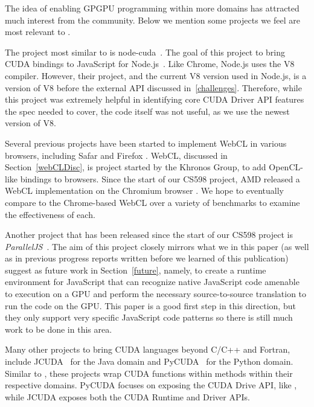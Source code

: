 
The idea of enabling GPGPU programming within more domains has attracted much
interest from the community. Below we mention some projects we feel are most relevant
to \namens.

The project most similar to \name is node-cuda~\cite{nodeCuda}. The goal of this
project to bring CUDA bindings to JavaScript for Node.js~\cite{nodeJS}. Like
Chrome, Node.js uses the V8 compiler. However, their project, and the current V8
version used in Node.js, is a version of V8 before the external API discussed
in~\ref{challenges}. Therefore, while this project was extremely helpful in
identifying core CUDA Driver API features the \name spec needed to cover, the
code itself was not useful, as we use the newest version of V8.

Several previous projects have been started to implement WebCL \cite{webCL} in various
browsers, including Safar \cite{safarWebCL} and Firefox \cite{firefoxWebCL}.
WebCL, discussed in Section~\ref{webCLDisc}, is project started by the Khronos
Group, to add OpenCL-like bindings to browsers. Since the start of our CS598
project, AMD released a WebCL implementation on the Chromium browser
\cite{chromeWebCL}. We hope to eventually compare \name to the Chrome-based
WebCL over a variety of benchmarks to examine the effectiveness of each.

Another project that has been released since the start of our CS598 project is
\textit{ParallelJS}~\cite{parallelJS}. The aim of this project closely mirrors
what we in this paper (as well as in previous progress reports written before we
learned of this publication) suggest as future work in Section~\ref{future}, namely, to create a
runtime environment for JavaScript that can recognize native JavaScript code amenable to
execution on a GPU and perform the necessary source-to-source translation to run
the code on the GPU. This paper is a good first step in this direction, but
they only support very specific JavaScript code patterns so there is still much
work to be done in this area.

Many other projects to bring CUDA languages beyond C/C++ and Fortran, include
JCUDA~\cite{jcuda} for the Java domain and PyCUDA~\cite{pycuda} for the Python domain.
Similar to \namens, these projects wrap CUDA functions within methods within
their respective domains. PyCUDA focuses on exposing the CUDA Drive API, like
\namens, while JCUDA exposes both the CUDA Runtime and Driver APIs.


